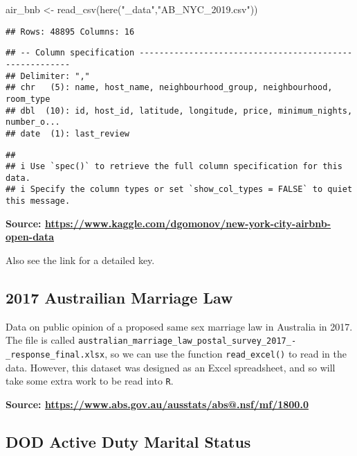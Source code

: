 \documentclass[
]{article}
\newenvironment{Shaded}{\begin{snugshade}}{\end{snugshade}}
\newcommand{\FunctionTok}[1]{\textcolor[rgb]{0.00,0.00,0.00}{#1}}
\newcommand{\NormalTok}[1]{#1}
\newcommand{\OtherTok}[1]{\textcolor[rgb]{0.56,0.35,0.01}{#1}}
\newcommand{\StringTok}[1]{\textcolor[rgb]{0.31,0.60,0.02}{#1}}
\begin{document}
\begin{Shaded}
\begin{Highlighting}[]
\NormalTok{air\_bnb }\OtherTok{\textless{}{-}} \FunctionTok{read\_csv}\NormalTok{(}\FunctionTok{here}\NormalTok{(}\StringTok{"\_data"}\NormalTok{,}\StringTok{"AB\_NYC\_2019.csv"}\NormalTok{))}
\end{Highlighting}
\end{Shaded}

\begin{verbatim}
## Rows: 48895 Columns: 16
\end{verbatim}

\begin{verbatim}
## -- Column specification --------------------------------------------------------
## Delimiter: ","
## chr   (5): name, host_name, neighbourhood_group, neighbourhood, room_type
## dbl  (10): id, host_id, latitude, longitude, price, minimum_nights, number_o...
## date  (1): last_review
\end{verbatim}

\begin{verbatim}
## 
## i Use `spec()` to retrieve the full column specification for this data.
## i Specify the column types or set `show_col_types = FALSE` to quiet this message.
\end{verbatim}

\textbf{Source:
\url{https://www.kaggle.com/dgomonov/new-york-city-airbnb-open-data}}

Also see the link for a detailed key.

\hypertarget{austrailian-marriage-law}{%
\subsection{2017 Austrailian Marriage
Law}\label{austrailian-marriage-law}}

Data on public opinion of a proposed same sex marriage law in Australia
in 2017. The file is called
\texttt{australian\_marriage\_law\_postal\_survey\_2017\_-\_response\_final.xlsx},
so we can use the function \texttt{read\_excel()} to read in the data.
However, this dataset was designed as an Excel spreadsheet, and so will
take some extra work to be read into \texttt{R}.

\textbf{Source:
\url{https://www.abs.gov.au/ausstats/abs@.nsf/mf/1800.0}}

\hypertarget{dod-active-duty-marital-status}{%
\subsection{DOD Active Duty Marital
Status}\label{dod-active-duty-marital-status}}
\end{document}
